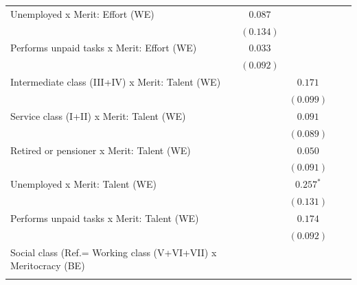 \documentclass[
  12pt,
]{article}
\begin{document}
\begin{table}
{\begin{center}
{\begin{tabular}{l c c c c}
\quad Unemployed x Merit: Effort (WE)                           & $0.087$       &               &               &               \\
                                                                & $(0.134)$     &               &               &               \\
\quad Performs unpaid tasks x Merit: Effort (WE)                & $0.033$       &               &               &               \\
                                                                & $(0.092)$     &               &               &               \\
\quad Intermediate class (III+IV) x Merit: Talent (WE)          &               & $0.171$       &               &               \\
                                                                &               & $(0.099)$     &               &               \\
\quad Service class (I+II) x Merit: Talent (WE)                 &               & $0.091$       &               &               \\
                                                                &               & $(0.089)$     &               &               \\
\quad Retired or pensioner x Merit: Talent (WE)                 &               & $0.050$       &               &               \\
                                                                &               & $(0.091)$     &               &               \\
\quad Unemployed x Merit: Talent (WE)                           &               & $0.257^{*}$   &               &               \\
                                                                &               & $(0.131)$     &               &               \\
\quad Performs unpaid tasks x Merit: Talent (WE)                &               & $0.174$       &               &               \\
                                                                &               & $(0.092)$     &               &               \\
Social class (Ref.= Working class (V+VI+VII) x Meritocracy (BE) &               &               &               &               \\
                                                                &               &               &               &               \\

\end{tabular}}
\end{center}}
\end{table}
\end{document}
